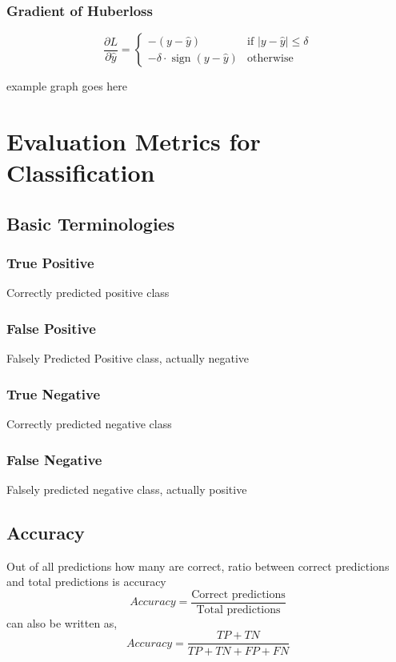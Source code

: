 \documentclass[12pt]{extarticle}
\begin{document}
\subsubsection{Gradient of Huberloss}

\[
\frac{\partial L}{\partial \hat{y}} =
\begin{cases}
-(y - \hat{y}) & \text{if } |y - \hat{y}| \leq \delta \\
-\delta \cdot \operatorname{sign}(y - \hat{y}) & \text{otherwise}
\end{cases}
\]

example graph goes here

\section{Evaluation Metrics for Classification}

\subsection{Basic Terminologies}

\subsubsection{True Positive}
Correctly predicted positive class

\subsubsection{False Positive}
Falsely Predicted Positive class, actually negative

\subsubsection{True Negative}
Correctly predicted negative class

\subsubsection{False Negative}
Falsely predicted negative class, actually positive 

\subsection{Accuracy}
Out of all predictions how many are correct, 
ratio between correct predictions and total predictions is accuracy
$$ Accuracy = \frac{\text{Correct predictions}} {\text{Total predictions}} $$
can also be written as,
$$ Accuracy = \frac{TP+TN}{TP+TN+FP+FN}  $$
\end{document}
